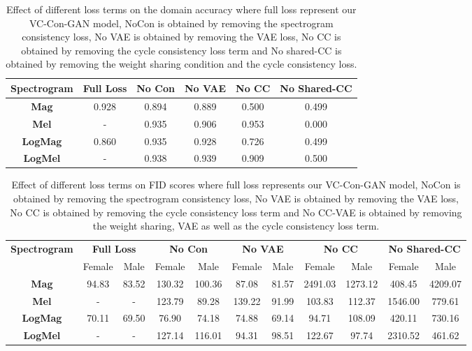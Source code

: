 \begin{table}[h]
    \centering
    \begin{tabular}{cccccc}
    \toprule
    \textbf{Spectrogram} &\textbf{Full Loss} & \textbf{No Con} & \textbf{No VAE} & \textbf{No CC} &\textbf{No Shared-CC}\\
    \midrule
    \textbf{Mag} &0.928& 0.894 & 0.889&0.500 & 0.499 \\
    \textbf{Mel} &- &0.935 & 0.906& 0.953 & 0.000\\
    \textbf{LogMag} &0.860 & 0.935 &0.928 & 0.726& 0.499\\
    \textbf{LogMel} & - &0.938&0.939&0.909 & 0.500 \\
    \bottomrule 
    \end{tabular}
    \caption[Ablation study: Domain accuracy]{Effect of different loss terms on the domain accuracy where full loss represent our VC-Con-GAN model, NoCon is obtained by removing the spectrogram consistency loss, No VAE is obtained by removing the VAE loss, No CC is obtained by removing the cycle consistency loss term and No shared-CC is obtained by removing the weight sharing condition and the cycle consistency loss.}
    \label{tab:ablation_study_acc}
\end{table}
\begin{landscape}
\begin{table}
    \centering
    \begin{tabular}{ccccccccccc}
    \toprule
    \textbf{Spectrogram} &\multicolumn{2}{c}{\textbf{Full Loss}} & \multicolumn{2}{c}{\textbf{No Con}} & \multicolumn{2}{c}{\textbf{No VAE}} & \multicolumn{2}{c}{\textbf{No CC}} &\multicolumn{2}{c}{\textbf{No Shared-CC}}\\
    & Female & Male & Female & Male & Female & Male & Female & Male & Female & Male\\
    \midrule
    \textbf{Mag} &94.83& 83.52& 130.32& 100.36 & 87.08 & 81.57 & 2491.03&1273.12& 408.45&4209.07\\
    \textbf{Mel} &- &- & 123.79& 89.28 &139.22 & 91.99 &103.83&112.37&1546.00&779.61\\
    \textbf{LogMag} &70.11 & 69.50 & 76.90  & 74.18 & 74.88& 69.14 & 94.71& 108.09 & 420.11 & 730.16\\
    \textbf{LogMel} & - & - & 127.14 & 116.01 & 94.31 & 98.51&122.67&97.74 &2310.52& 461.62\\
    \bottomrule 
    \end{tabular}
    \caption[Ablation study: FID]{Effect of different loss terms on FID scores where full loss represents our VC-Con-GAN model, NoCon is obtained by removing the spectrogram consistency loss, No VAE is obtained by removing the VAE loss, No CC is obtained by removing the cycle consistency loss term and No CC-VAE is obtained by removing the weight sharing, VAE as well as the cycle consistency loss term. }
    \label{tab:ablation_study_fid}
\end{table}
\end{landscape}


